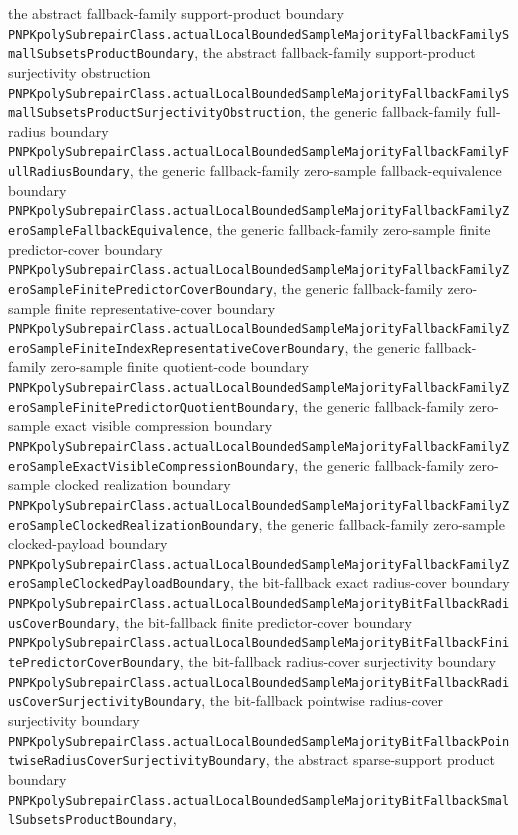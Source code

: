 \documentclass[11pt]{article}
\theoremstyle{remark}
\begin{document}
the abstract fallback-family support-product boundary
\texttt{PNPKpolySubrepairClass.actualLocalBoundedSampleMajorityFallbackFamilySmallSubsetsProductBoundary},
the abstract fallback-family support-product surjectivity obstruction
\texttt{PNPKpolySubrepairClass.actualLocalBoundedSampleMajorityFallbackFamilySmallSubsetsProductSurjectivityObstruction},
the generic fallback-family full-radius boundary
\texttt{PNPKpolySubrepairClass.actualLocalBoundedSampleMajorityFallbackFamilyFullRadiusBoundary},
the generic fallback-family zero-sample fallback-equivalence boundary
\texttt{PNPKpolySubrepairClass.actualLocalBoundedSampleMajorityFallbackFamilyZeroSampleFallbackEquivalence},
the generic fallback-family zero-sample finite predictor-cover boundary
\texttt{PNPKpolySubrepairClass.actualLocalBoundedSampleMajorityFallbackFamilyZeroSampleFinitePredictorCoverBoundary},
the generic fallback-family zero-sample finite representative-cover boundary
\texttt{PNPKpolySubrepairClass.actualLocalBoundedSampleMajorityFallbackFamilyZeroSampleFiniteIndexRepresentativeCoverBoundary},
the generic fallback-family zero-sample finite quotient-code boundary
\texttt{PNPKpolySubrepairClass.actualLocalBoundedSampleMajorityFallbackFamilyZeroSampleFinitePredictorQuotientBoundary},
the generic fallback-family zero-sample exact visible compression boundary
\texttt{PNPKpolySubrepairClass.actualLocalBoundedSampleMajorityFallbackFamilyZeroSampleExactVisibleCompressionBoundary},
the generic fallback-family zero-sample clocked realization boundary
\texttt{PNPKpolySubrepairClass.actualLocalBoundedSampleMajorityFallbackFamilyZeroSampleClockedRealizationBoundary},
the generic fallback-family zero-sample clocked-payload boundary
\texttt{PNPKpolySubrepairClass.actualLocalBoundedSampleMajorityFallbackFamilyZeroSampleClockedPayloadBoundary},
the bit-fallback exact radius-cover boundary
\texttt{PNPKpolySubrepairClass.actualLocalBoundedSampleMajorityBitFallbackRadiusCoverBoundary},
the bit-fallback finite predictor-cover boundary
\texttt{PNPKpolySubrepairClass.actualLocalBoundedSampleMajorityBitFallbackFinitePredictorCoverBoundary},
the bit-fallback radius-cover surjectivity boundary
\texttt{PNPKpolySubrepairClass.actualLocalBoundedSampleMajorityBitFallbackRadiusCoverSurjectivityBoundary},
the bit-fallback pointwise radius-cover surjectivity boundary
\texttt{PNPKpolySubrepairClass.actualLocalBoundedSampleMajorityBitFallbackPointwiseRadiusCoverSurjectivityBoundary},
the abstract sparse-support product boundary
\texttt{PNPKpolySubrepairClass.actualLocalBoundedSampleMajorityBitFallbackSmallSubsetsProductBoundary},
\end{document}
